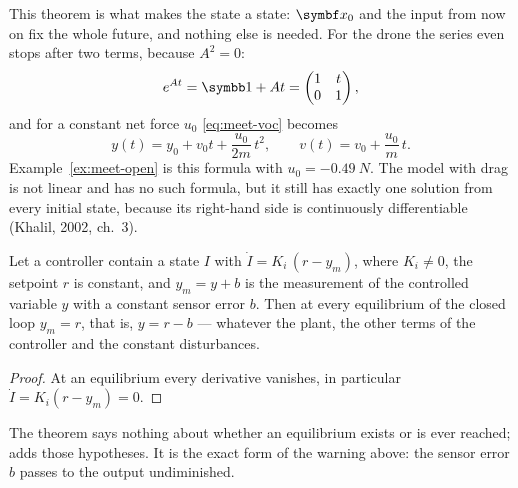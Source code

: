 This theorem is what makes the state a state: $\vx_0$ and the input from now on fix the whole future, and nothing else is needed. For the drone the series even stops after two terms, because $A^2 = 0$:
\begin{equation*}
  e^{At} = \Id + At = \begin{pmatrix} 1 & t \\ 0 & 1 \end{pmatrix},
\end{equation*}
and for a constant net force $u_0$ \cref{eq:meet-voc} becomes
\begin{equation*}
  y(t) = y_0 + v_0 t + \frac{u_0}{2m}\,t^2, \qquad v(t) = v_0 + \frac{u_0}{m}\,t .
\end{equation*}
Example~\ref{ex:meet-open} is this formula with $u_0 = \SI{-0.49}{N}$. The model with drag is not linear and has no such formula, but it still has exactly one solution from every initial state, because its right-hand side is continuously differentiable (Khalil, 2002, ch.~3).

\begin{theorem}
\label{thm:meet-sensor}
Let a controller contain a state $I$ with $\dot I = K_i\,(r - y_m)$, where $K_i \ne 0$, the setpoint $r$ is constant, and $y_m = y + b$ is the measurement of the controlled variable $y$ with a constant sensor error $b$. Then at every equilibrium of the closed loop $y_m = r$, that is, $y = r - b$ — whatever the plant, the other terms of the controller and the constant disturbances.
\end{theorem}
\begin{proof}
At an equilibrium every derivative vanishes, in particular $\dot I = K_i(r - y_m) = 0$.
\end{proof}

The theorem says nothing about whether an equilibrium exists or is ever reached;  adds those hypotheses. It is the exact form of the warning above: the sensor error $b$ passes to the output undiminished.

